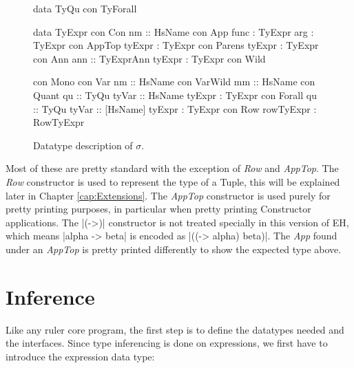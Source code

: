 \begin{figure}[H]
\begin{minipage}[t]{0.4\linewidth}
\begin{code}
data TyQu
  con TyForall
    
data TyExpr
  con Con
    nm         :: HsName
  con App      
    func       :  TyExpr
    arg        :  TyExpr
  con AppTop   
    tyExpr     :  TyExpr
  con Parens   
    tyExpr     :  TyExpr
  con Ann      
    ann        :: TyExprAnn
    tyExpr     :  TyExpr
  con Wild
\end{code}
\end{minipage}
\begin{minipage}[t]{0.6\linewidth}
\begin{code}
  con Mono
  con Var
    nm         :: HsName
  con VarWild  
    mm         :: HsName
  con Quant    
    qu         :: TyQu
    tyVar      :: HsName
    tyExpr     :  TyExpr
  con Forall   
    qu         :: TyQu
    tyVar      :: [HsName]
    tyExpr     :  TyExpr    
  con Row      
    rowTyExpr  :  RowTyExpr
\end{code}
\end{minipage}
\caption{Datatype description of $\sigma$.}
\label{abs:fig:tyexpr}
\end{figure}

Most of these are pretty standard with the exception of \emph{Row} and \emph{AppTop}. The \emph{Row} constructor is used to represent the type of a Tuple, this will be explained later in Chapter \ref{cap:Extensions}. 
The \emph{AppTop} constructor is used purely for pretty printing purposes, in particular when pretty printing Constructor applications. The |(->)| constructor is not treated specially in this version of EH, which means |alpha -> beta| is encoded as |((-> alpha) beta)|. The \emph{App} found under an \emph{AppTop} is pretty printed differently to show the expected type above.

\section{Inference}
Like any ruler core program, the first step is to define the datatypes needed and the interfaces. Since type inferencing is done on expressions, we first have to introduce the expression data type:

